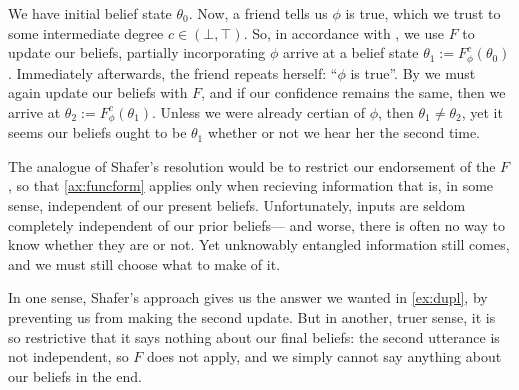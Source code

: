 \begin{subappendices}
    \begin{example}\label{ex:dupl}
    	We have initial belief state $\theta_0$.
    	Now, a friend tells us $\phi$ is true, 
    	which we trust to some intermediate degree 
    	$c \in (\bot,\!\top)$.
    	So, in accordance with , we use $F$ to update our beliefs, partially incorporating $\phi$ arrive at a belief state $\theta_1 := F^c_\phi(\theta_0)$.
    	Immediately afterwards, the friend repeats herself: ``$\phi$ is true''.
    	By 
    	we must again update our beliefs with $F$,
    	and if our confidence remains the same,
    	then we arrive at $\theta_2 := F^c_\phi(\theta_1)$.
    	Unless we were already certian of $\phi$, then $\theta_1 \ne \theta_2$,
    	yet it seems our beliefs ought
    	to be $\theta_1$ whether or not we hear her the second time.
    \end{example}


    The analogue of Shafer's resolution would be to 
    restrict our endorsement of the $F$,
    so that \cref{ax:funcform} applies only when recieving information that is, in some sense, independent of our present beliefs. 
    Unfortunately, inputs are seldom completely
    	independent of our prior beliefs---%
    	and worse, there is often no way to know
    	whether they are or not. 
    Yet unknowably entangled information still comes, and we must still choose
    	what to make of it.
    	
    In one sense, Shafer's approach gives us the answer we wanted in 
    \cref{ex:dupl}, by preventing us from making the second update. 
    But in another, truer sense, it is so restrictive that 
    it says nothing about our final beliefs: 
    the second utterance is not independent, so $F$ does not apply, 
    	and we simply cannot say anything about our beliefs in the end.
    	

\end{subappendices}
